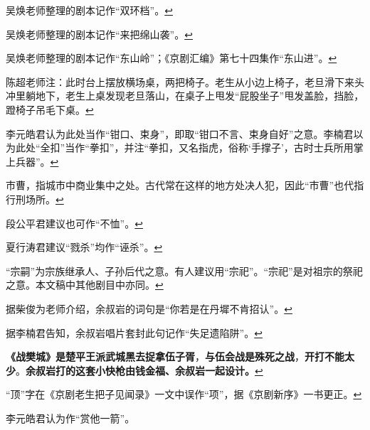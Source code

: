 \item
  \leavevmode\hypertarget{fn46}{}%
  吴焕老师整理的剧本记作``双环档''。\protect\hyperlink{fnref46}{↩}
\item
  \leavevmode\hypertarget{fn47}{}%
  吴焕老师整理的剧本记作``来把绵山袭''。\protect\hyperlink{fnref47}{↩}
\item
  \leavevmode\hypertarget{fn48}{}%
  吴焕老师整理的剧本记作``东山岭''；《京剧汇编》第七十四集作``东山进''。\protect\hyperlink{fnref48}{↩}
\item
  \leavevmode\hypertarget{fn49}{}%
  陈超老师注：此时台上摆放横场桌，两把椅子。老生从小边上椅子，老旦滑下来头冲里躺地下，老生上桌发现老旦落山，在桌子上甩发``屁股坐子''甩发盖脸，挡脸，蹬椅子吊毛下桌。\protect\hyperlink{fnref49}{↩}
\item
  \leavevmode\hypertarget{fn50}{}%
  李元皓君认为此处当作``钳口、束身''，即取``钳口不言、束身自好''之意。李楠君以为此处``全扣''当作``拳扣''，并注``拳扣，又名指虎，俗称`手撑子'，古时士兵所用掌上兵器''。\protect\hyperlink{fnref50}{↩}
\item
  \leavevmode\hypertarget{fn51}{}%
  市曹，指城市中商业集中之处。古代常在这样的地方处决人犯，因此``市曹''也代指行刑场所。\protect\hyperlink{fnref51}{↩}
\item
  \leavevmode\hypertarget{fn52}{}%
  段公平君建议也可作``不恤''。\protect\hyperlink{fnref52}{↩}
\item
  \leavevmode\hypertarget{fn53}{}%
  夏行涛君建议``戮杀''均作``诬杀''。\protect\hyperlink{fnref53}{↩}
\item
  \leavevmode\hypertarget{fn54}{}%
  ``宗嗣''为宗族继承人、子孙后代之意。有人建议用``宗祀''。``宗祀''是对祖宗的祭祀之意。本文稿中其他剧目中亦同。\protect\hyperlink{fnref54}{↩}
\item
  \leavevmode\hypertarget{fn55}{}%
  据柴俊为老师介绍，余叔岩的词句是``你若是在丹墀不肯招认''。\protect\hyperlink{fnref55}{↩}
\item
  \leavevmode\hypertarget{fn56}{}%
  据李楠君告知，余叔岩唱片套封此句记作``失足遗陷阱''。\protect\hyperlink{fnref56}{↩}
\item
  \leavevmode\hypertarget{fn57}{}%
  \textbf{《战樊城》是楚平王派武城黑去捉拿伍子胥}，\textbf{与伍会战是殊死之战}，\textbf{开打不能太少}。\textbf{余叔岩打的这套小快枪由钱金福、余叔岩一起设计。}\protect\hyperlink{fnref57}{↩}
\item
  \leavevmode\hypertarget{fn58}{}%
  ``顶''字在《京剧老生把子见闻录》一文中误作``项''，据《京剧新序》一书更正。\protect\hyperlink{fnref58}{↩}
\item
  \leavevmode\hypertarget{fn59}{}%
  李元皓君认为作``赏他一箭''。

